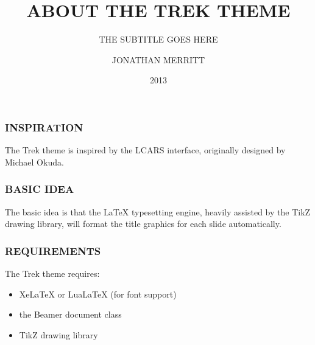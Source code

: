 \documentclass{beamer}
\begin{document}
\title{ABOUT THE TREK THEME}
\author{JONATHAN MERRITT}
\subtitle{THE SUBTITLE GOES HERE}
\date{2013}

\begin{frame}
  \titlepage
\end{frame}

\begin{frame}
  \frametitle{INSPIRATION}
  The Trek theme is inspired by the LCARS interface, originally designed by Michael Okuda.
\end{frame}

\begin{frame}
  \frametitle{BASIC IDEA}
  The basic idea is that the LaTeX typesetting engine, heavily assisted by the TikZ drawing library,
  will format the title graphics for each slide automatically.
\end{frame}

\begin{frame}
  \frametitle{REQUIREMENTS}
  The Trek theme requires:
  \begin{itemize}
    \item XeLaTeX or LuaLaTeX (for font support)
    \item the Beamer document class
    \item TikZ drawing library
  \end{itemize}
\end{frame}
\end{document}
